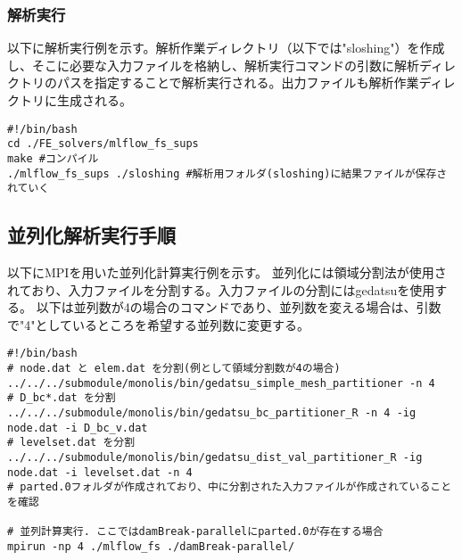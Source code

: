 \subsubsection{解析実行}

以下に解析実行例を示す。解析作業ディレクトリ（以下では"sloshing"）を作成し、そこに必要な入力ファイルを格納し、解析実行コマンドの引数に解析ディレクトリのパスを指定することで解析実行される。出力ファイルも解析作業ディレクトリに生成される。
\begin{lstlisting}[]
#!/bin/bash
cd ./FE_solvers/mlflow_fs_sups
make #コンパイル
./mlflow_fs_sups ./sloshing #解析用フォルダ(sloshing)に結果ファイルが保存されていく
\end{lstlisting}

\subsection{並列化解析実行手順}

以下にMPIを用いた並列化計算実行例を示す。
並列化には領域分割法が使用されており、入力ファイルを分割する。入力ファイルの分割にはgedatsuを使用する。
以下は並列数が4の場合のコマンドであり、並列数を変える場合は、引数で"4"としているところを希望する並列数に変更する。

\begin{lstlisting}[]
#!/bin/bash
# node.dat と elem.dat を分割(例として領域分割数が4の場合)
../../../submodule/monolis/bin/gedatsu_simple_mesh_partitioner -n 4
# D_bc*.dat を分割
../../../submodule/monolis/bin/gedatsu_bc_partitioner_R -n 4 -ig node.dat -i D_bc_v.dat
# levelset.dat を分割
../../../submodule/monolis/bin/gedatsu_dist_val_partitioner_R -ig node.dat -i levelset.dat -n 4
# parted.0フォルダが作成されており、中に分割された入力ファイルが作成されていることを確認

# 並列計算実行. ここではdamBreak-parallelにparted.0が存在する場合
mpirun -np 4 ./mlflow_fs ./damBreak-parallel/
\end{lstlisting}